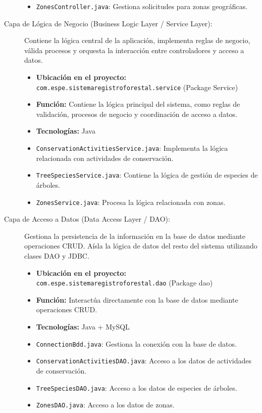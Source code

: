 \begin{description}
\begin{itemize}
        \item \texttt{ZonesController.java}: Gestiona solicitudes para zonas geográficas.
    \end{itemize}
    \item[Capa de Lógica de Negocio (Business Logic Layer / Service Layer):] Contiene la lógica central de la aplicación, implementa reglas de negocio, válida procesos y orquesta la interacción entre controladores y acceso a datos.
    \begin{itemize}
        \item \textbf{Ubicación en el proyecto:} \texttt{com.espe.sistemaregistroforestal.service} (Package Service)
        \item \textbf{Función:} Contiene la lógica principal del sistema, como reglas de validación, procesos de negocio y coordinación de acceso a datos.
        \item \textbf{Tecnologías:} Java
        \item \texttt{ConservationActivitiesService.java}: Implementa la lógica relacionada con actividades de conservación.
        \item \texttt{TreeSpeciesService.java}: Contiene la lógica de gestión de especies de árboles.
        \item \texttt{ZonesService.java}: Procesa la lógica relacionada con zonas.
    \end{itemize}
    \item[Capa de Acceso a Datos (Data Access Layer / DAO):] Gestiona la persistencia de la información en la base de datos mediante operaciones CRUD. Aísla la lógica de datos del resto del sistema utilizando clases DAO y JDBC.
    \begin{itemize}
        \item \textbf{Ubicación en el proyecto:} \texttt{com.espe.sistemaregistroforestal.dao} (Package dao)
        \item \textbf{Función:} Interactúa directamente con la base de datos mediante operaciones CRUD.
        \item \textbf{Tecnologías:} Java + MySQL
        \item \texttt{ConnectionBdd.java}: Gestiona la conexión con la base de datos.
        \item \texttt{ConservationActivitiesDAO.java}: Acceso a los datos de actividades de conservación.
        \item \texttt{TreeSpeciesDAO.java}: Acceso a los datos de especies de árboles.
        \item \texttt{ZonesDAO.java}: Acceso a los datos de zonas.

\end{itemize}
\end{description}
